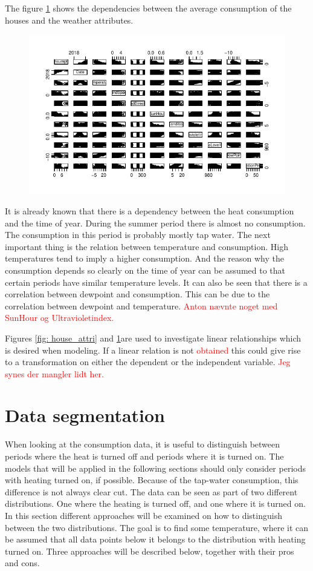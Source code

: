 The figure \ref{fig: weather_cons_focus} shows the dependencies between the average consumption of the houses and the weather attributes.
\begin{figure}
    \centering
    \includegraphics[width=.75\textwidth]{../../../figures/weather_cons_focus.pdf}
    \caption{}
    \label{fig: weather_cons_focus}
\end{figure}

It is already known that there is a dependency between the heat consumption and the time of year. During the summer period there
is almost no consumption. The consumption in this period is probably mostly tap water. The next important thing is the relation between temperature and consumption. High temperatures tend to imply a higher consumption. And the reason why the consumption depends so clearly on the time of year can be assumed to that certain periods have similar temperature levels. It can also be seen that there is a correlation between dewpoint and consumption. This can be due to the correlation between dewpoint and temperature. \textcolor{red}{Anton nævnte noget med SunHour og Ultravioletindex.}

Figures \ref{fig: house_attri} and \ref{fig: weather_cons_focus}are used to investigate linear relationships which is desired when modeling. If a linear relation is not \textcolor{red}{obtained} this could give rise to a transformation on either the dependent or the independent variable. \textcolor{red}{Jeg synes der mangler lidt her.}

\section{Data segmentation}
When looking at the consumption data, it is useful to distinguish between periods where the heat is turned off and periods where it is turned on. The models that will be applied in the following sections should only consider periods with heating turned on, if possible. Because of the tap-water consumption, this difference is not always clear cut.
The data can be seen as part of two different distributions. One where the heating is turned off, and one where it is turned on. In this section different  approaches will be examined on how to distinguish between the two distributions.
The goal is to find some temperature, where it can be assumed that all data points below it belongs to the distribution with heating turned on. Three approaches will be described below, together with their pros and cons.

